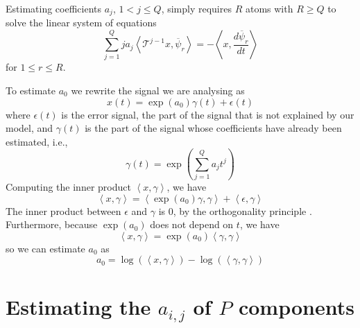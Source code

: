 \documentclass[twoside,a4paper]{article}
\begin{document}
Estimating coefficients $a_j$, ${1 < j \leq Q}$,
simply requires $R$ atoms with $R \geq Q$ to solve the linear system of
equations
\begin{equation}
    \label{eq:ddmsyseq}
    \sum_{j=1}^{Q} j a_j 
    \left\langle \mathcal{T}^{j-1} x , \overline{\psi}_{r} \right\rangle
    = -\left\langle x, \frac{d\overline{\psi}_{r}}{dt} \right\rangle
\end{equation}
for $1 \leq r \leq R$.

To estimate $a_0$ we rewrite the signal we are analysing as
\[
    x(t) = \exp(a_0) \gamma(t) + \epsilon (t)
\]
where $\epsilon (t)$ is the error signal, the part of the signal that is not explained
by our model, and $\gamma (t)$ is the part of the signal
whose coefficients have already been estimated, i.e.,
\[
    \gamma(t) = \exp \left( \sum_{j=1}^{Q} a_j t^{j} \right)
\]
Computing the inner product $\left\langle x , \gamma \right\rangle$, we have
\[
    \left\langle x , \gamma \right\rangle
    =
    \left\langle \exp(a_0) \gamma , \gamma \right\rangle + 
        \left\langle \epsilon , \gamma \right\rangle
\]
The inner product between $\epsilon$ and $\gamma$ is $0$, by the orthogonality
principle \cite[ch.~12]{kay1993fundamentals}. Furthermore, because $\exp(a_0)$ does not
depend on $t$, we have
\[
    \left\langle x , \gamma \right\rangle
    =
    \exp(a_0) \left\langle \gamma , \gamma \right\rangle
\]
so we can estimate $a_0$ as
\begin{equation}
    \label{eq:ddmesta0}
    a_0 = \log \left( \left\langle x , \gamma \right\rangle \right)
        - \log \left( \left\langle \gamma , \gamma \right\rangle \right)
\end{equation}

\section{Estimating the \lowercase{$a_{i,j}$} of $P$ components}
\end{document}
